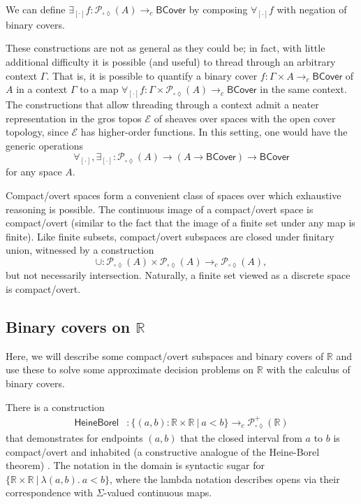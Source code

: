\documentclass[conference]{IEEEtran}
\newcommand{\Viet}{\mathcal{P}_{\square\lozenge}}
\newcommand{\cto}{\to_c}
\newcommand{\R}{\mathbb{R}}
\newcommand{\fun}[2]{\lambda {#1}.\  {#2}}
\newcommand{\suchthat}{\ |\ }
\newcommand{\BCover}{\mathsf{BCover}}
\begin{document}
We can define $\exists_{[\cdot]} f : \Viet(A) \cto \BCover$ by composing $\forall_{[\cdot]} f$ with negation of binary covers.

These constructions are not as general as they could be; in fact, with little additional difficulty it is possible (and useful) to thread through an arbitrary context $\Gamma$. That is, it is possible to quantify a binary cover $f : \Gamma \times A \cto \BCover$ of $A$ in a context $\Gamma$ to a map $\forall_{[\cdot]}f : \Gamma \times \Viet(A) \cto \BCover$ in the same context. The constructions that allow threading through a context admit a neater representation in the gros topos $\mathcal{E}$ of sheaves over spaces with the open cover topology, since $\mathcal{E}$ has higher-order functions. In this setting, one would have the generic operations 
\[
\forall_{[\cdot]}, \exists_{[\cdot]} : \Viet(A) \to (A \to \BCover) \to \BCover
\]
for any space $A$.

Compact/overt spaces form a convenient class of spaces over which exhaustive reasoning is possible. The continuous image of a compact/overt space is compact/overt (similar to the fact that the image of a finite set under any map is finite). Like finite subsets, compact/overt subspaces are closed under finitary union, witnessed by a construction
\[
\cup : \Viet(A) \times \Viet(A) \cto \Viet(A),
\]
but not necessarily intersection. Naturally, a finite set viewed as a discrete space is compact/overt.

\subsection{Binary covers on $\R$}

Here, we will describe some compact/overt subspaces and binary covers of $\R$ and use these to solve some approximate decision problems on $\R$ with the calculus of binary covers.

There is a construction
\begin{align*}
\mathsf{HeineBorel} &: \{ (a, b) : \R \times \R \suchthat a < b \} \cto \Viet^+(\R)
\end{align*}
that demonstrates for endpoints $(a, b)$ that the closed interval from $a$ to $b$ is compact/overt and inhabited (a constructive analogue of the Heine-Borel theorem) \cite{vickersmetric2}. The notation in the domain is syntactic sugar for $\{ \R \times \R \suchthat \fun{(a,b)}{a < b} \}$, where the lambda notation describes opens via their correspondence with $\Sigma$-valued continuous maps.
\end{document}
